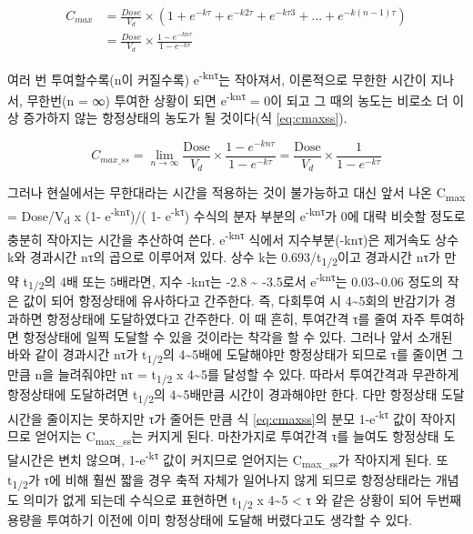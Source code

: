 \documentclass[
  11pt,
  krantz2, a4paper, twoside]{krantz}
\begin{document}
\begin{equation}
\begin{split}
  C_{max} &= \frac{Dose}{V_{d}} \times \left( 1 + e^{- k\tau} + e^{- k2\tau} + e^{- k\tau 3} + \ldots + e^{- k\left( n - 1 \right)\tau} \right)  \\
  &= \frac{Dose}{V_{d}} \times \frac{1 - e^{- kn\tau}}{1 - e^{- k\tau}}
\end{split}
\label{eq:cmax}
\end{equation}

여러 번 투여할수록(n이 커질수록) e\textsuperscript{-knτ}는 작아져서, 이론적으로 무한한 시간이 지나서, 무한번(n = ∞) 투여한 상황이 되면 e\textsuperscript{-knτ} = 0이 되고 그 때의 농도는 비로소 더 이상 증가하지 않는 항정상태의 농도가 될 것이다(식 \eqref{eq:cmaxss}).

\begin{equation}
{C_{max\_ ss} = \lim_{n \rightarrow \infty}}{\frac{\text{Dose}}{V_{d}} \times \frac{1 - e^{- kn\tau}}{1 - e^{- k\tau}} = \frac{\text{Dose}}{V_{d}} \times \frac{1}{1 - e^{- k\tau}}}
\label{eq:cmaxss}
\end{equation}

그러나 현실에서는 무한대라는 시간을 적용하는 것이 불가능하고 대신 앞서 나온 C\textsubscript{max} = Dose/V\textsubscript{d} x (1- e\textsuperscript{-knτ})/( 1- e\textsuperscript{-kτ}) 수식의 분자 부분의 e\textsuperscript{-knτ}가 0에 대략 비슷할 정도로 충분히 작아지는 시간을 추산하여 쓴다.
e\textsuperscript{-knτ} 식에서 지수부분(-knτ)은 제거속도 상수 k와 경과시간 nτ의 곱으로 이루어져 있다.
상수 k는 0.693/t\textsubscript{1/2}이고 경과시간 nτ가 만약 t\textsubscript{1/2}의 4배 또는 5배라면, 지수 -knτ는 -2.8 \textasciitilde{} -3.5로서 e\textsuperscript{-knτ}는 0.03\textasciitilde0.06 정도의 작은 값이 되어 항정상태에 유사하다고 간주한다.
즉, 다회투여 시 4\textasciitilde5회의 반감기가 경과하면 항정상태에 도달하였다고 간주한다.
이 때 흔히, 투여간격 τ를 줄여 자주 투여하면 항정상태에 일찍 도달할 수 있을 것이라는 착각을 할 수 있다.
그러나 앞서 소개된 바와 같이 경과시간 nτ가 t\textsubscript{1/2}의 4\textasciitilde5배에 도달해야만 항정상태가 되므로 τ를 줄이면 그만큼 n을 늘려줘야만 nτ = t\textsubscript{1/2} x 4\textasciitilde5를 달성할 수 있다. 따라서 투여간격과 무관하게 항정상태에 도달하려면 t\textsubscript{1/2}의 4\textasciitilde5배만큼 시간이 경과해야만 한다.
다만 항정상태 도달시간을 줄이지는 못하지만 τ가 줄어든 만큼 식 \eqref{eq:cmaxss}의 분모 1-e\textsuperscript{-kτ} 값이 작아지므로 얻어지는 C\textsubscript{max\_ss}는 커지게 된다.
마찬가지로 투여간격 τ를 늘여도 항정상태 도달시간은 변치 않으며, 1-e\textsuperscript{-kτ} 값이 커지므로 얻어지는 C\textsubscript{max\_ss}가 작아지게 된다.
또 t\textsubscript{1/2}가 τ에 비해 훨씬 짧을 경우 축적 자체가 일어나지 않게 되므로 항정상태라는 개념도 의미가 없게 되는데 수식으로 표현하면 t\textsubscript{1/2} x 4\textasciitilde5 \textless{} τ 와 같은 상황이 되어 두번째 용량을 투여하기 이전에 이미 항정상태에 도달해 버렸다고도 생각할 수 있다.
\end{document}
